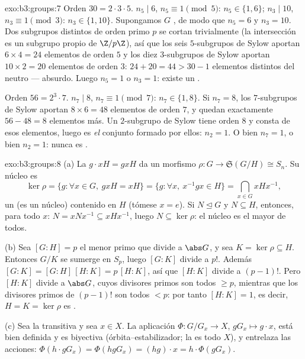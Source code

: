 \begin{solution}{exo:b3:groups:7}
Orden $30 = 2 \cdot 3 \cdot 5$. $n_5 \mid 6$, $n_5 \equiv 1 \pmod
5$: $n_5 \in \{1, 6\}$; $n_3 \mid 10$, $n_3 \equiv 1 \pmod 3$:
$n_3 \in \{1, 10\}$. Supongamos $G$
, de modo que $n_5 = 6$ y $n_3 =
10$. Dos subgrupos distintos de orden primo $p$ se cortan trivialmente
(la intersección es un subgrupo propio de $\Z/p\Z$), así que los seis
$5$-subgrupos de Sylow aportan $6 \times 4 = 24$ elementos de orden $5$
y los diez $3$-subgrupos de Sylow aportan $10 \times 2 = 20$ elementos
de orden $3$: $24 + 20 = 44 > 30 - 1$ elementos distintos del neutro ---
absurdo. Luego $n_5 = 1$ o $n_3 = 1$: existe un 
.

Orden $56 = 2^3 \cdot 7$. $n_7 \mid 8$, $n_7 \equiv 1 \pmod 7$:
$n_7 \in \{1, 8\}$. Si $n_7 = 8$, los $7$-subgrupos de Sylow aportan $8
\times 6 = 48$ elementos de orden $7$, y quedan exactamente $56 - 48 =
8$ elementos más. Un $2$-subgrupo de Sylow tiene orden $8$ y consta de
esos elementos, luego es \emph{el} conjunto formado por ellos:
$n_2 = 1$. O bien $n_7 = 1$, o bien $n_2 = 1$: nunca es
.
\end{solution}

\begin{solution}{exo:b3:groups:8}
(a) La  $g \cdot xH = gxH$ da un
morfismo $\rho \colon G
\to \mathfrak S(G/H) \cong S_n$. Su núcleo es
\[
\ker\rho = \{g : \forall x \in G,\ gxH = xH\}
= \{g : \forall x,\ x^{-1}gx \in H\}
= \bigcap_{x \in G} xHx^{-1},
\]
un  (es un núcleo)
contenido en $H$ (tómese $x = e$). Si $N \trianglelefteq G$ y
$N \subseteq H$, entonces, para todo $x$: $N
= xNx^{-1} \subseteq xHx^{-1}$, luego $N \subseteq \ker\rho$: el núcleo
es el mayor de todos.

(b) Sea $[G:H] = p$ el menor primo que divide a $\abs G$, y sea $K =
\ker\rho \subseteq H$. Entonces $G/K$ se sumerge en $S_p$, luego $[G:K]$
divide a $p!$. Además $[G:K] = [G:H]\,[H:K] = p\,[H:K]$, así que $[H:K]$
divide a $(p-1)!$. Pero $[H:K]$ divide a $\abs G$, cuyos divisores
primos son todos $\geq p$, mientras que los divisores primos de $(p-1)!$
son todos $< p$: por tanto $[H:K] = 1$, es decir, $H = K = \ker \rho$ es
.

(c) Sea la  transitiva y sea
$x \in X$. La aplicación $\Phi
\colon G/G_x \to X$, $gG_x \mapsto g \cdot x$, está bien definida y es
biyectiva (órbita--estabilizador; la
 es todo $X$), y entrelaza las
acciones:
$\Phi(h \cdot gG_x) = \Phi(hgG_x) = (hg)
\cdot x = h \cdot \Phi(gG_x)$.
\end{solution}

